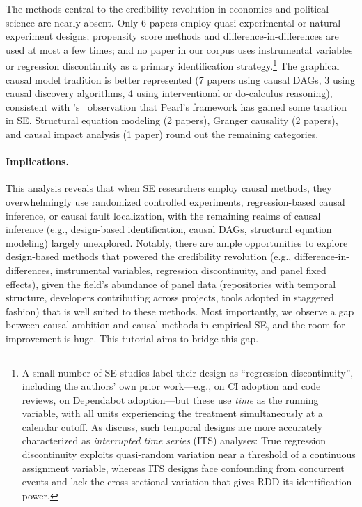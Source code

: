 The methods central to the credibility revolution in economics and political science are nearly absent.
Only 6 papers employ quasi-experimental or natural experiment designs; propensity score methods and difference-in-differences are used at most a few times; and no paper in our corpus uses instrumental variables or regression discontinuity as a primary identification strategy.\footnote{A small number of SE studies label their design as ``regression discontinuity'', including the authors' own prior work---e.g., \citet{DBLP:conf/wcre/CasseeVS20} on CI adoption and code reviews, \citet{DBLP:journals/tse/HeHZZ23} on Dependabot adoption---but these use \emph{time} as the running variable, with all units experiencing the treatment simultaneously at a calendar cutoff.
As \citet{hausman2018regression} discuss, such temporal designs are more accurately characterized as \emph{interrupted time series} (ITS) analyses: True regression discontinuity exploits quasi-random variation near a threshold of a continuous assignment variable, whereas ITS designs face confounding from concurrent events and lack the cross-sectional variation that gives RDD its identification power.}
The graphical causal model tradition is better represented (7 papers using causal DAGs, 3 using causal discovery algorithms, 4 using interventional or do-calculus reasoning), consistent with \citeauthor{DBLP:journals/infsof/Siebert23}'s~\cite{DBLP:journals/infsof/Siebert23} observation that Pearl's framework has gained some traction in SE\@.
Structural equation modeling (2 papers), Granger causality (2 papers), and causal impact analysis (1 paper) round out the remaining categories.

\paragraph{Implications.}
This analysis reveals that when SE researchers employ causal methods, they overwhelmingly use randomized controlled experiments, regression-based causal inference, or causal fault localization, with the remaining realms of causal inference (e.g., design-based identification, causal DAGs, structural equation modeling) largely unexplored.
Notably, there are ample opportunities to explore design-based methods that powered the credibility revolution (e.g., difference-in-differences, instrumental variables, regression discontinuity, and panel fixed effects), given the field's abundance of panel data (repositories with temporal structure, developers contributing across projects, tools adopted in staggered fashion) that is well suited to these methods.
Most importantly, we observe a gap between causal ambition and causal methods in empirical SE, and the room for improvement is huge.
This tutorial aims to bridge this gap.
